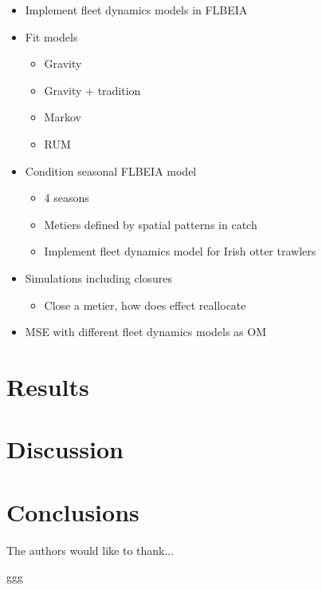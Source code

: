 \documentclass[12pt, halfline, a4paper]{ouparticle}
\begin{document}
\begin{itemize}
	\item Implement fleet dynamics models in FLBEIA
	\item Fit models
		\begin{itemize}
			\item Gravity
			\item Gravity + tradition
			\item Markov
			\item RUM
		\end{itemize}
	\item Condition seasonal FLBEIA model
		\begin{itemize}
			\item 4 seasons
			\item Metiers defined by spatial patterns in catch
			\item Implement fleet dynamics model for Irish otter
				trawlers
		\end{itemize}
	\item Simulations including closures
		\begin{itemize}
			\item Close a metier, how does effect reallocate
		\end{itemize}
	\item MSE with different fleet dynamics models as OM
\end{itemize}

\section{Results}
\label{res}

\section{Discussion}
\label{dis}

\section{Conclusions}
\label{con}


\begin{notes}[Acknowledgements]
The authors would like to thank...
\end{notes}

\begin{thebibliography}
ggg
\end{thebibliography}


\end{document}
